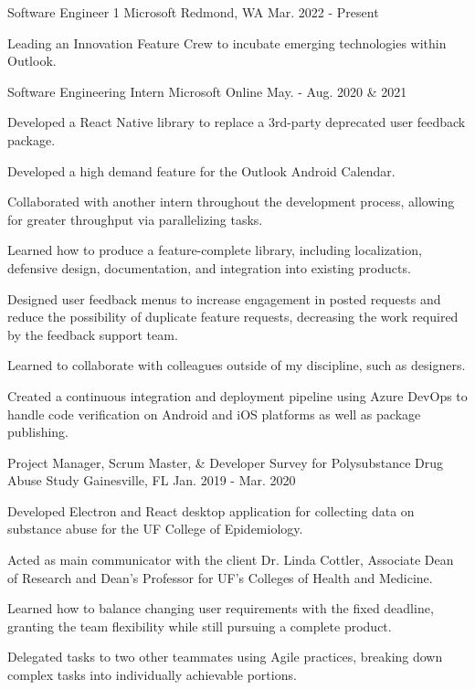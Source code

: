 \begin{cventries}
  \cventry
    {Software Engineer 1}
    {Microsoft}
    {Redmond, WA}
    {Mar. 2022 - Present}
    {
      \begin{cvitems}
        \item{Leading an Innovation Feature Crew to incubate emerging technologies within Outlook.}
      \end{cvitems}
    }
  \cventry
    {Software Engineering Intern}
    {Microsoft}
    {Online}
    {May. - Aug. 2020 \& 2021}
    {
      \begin{cvitems}
        \item{Developed a React Native library to replace a 3rd-party deprecated user feedback package.}
        \item{Developed a high demand feature for the Outlook Android Calendar.}
        \item{Collaborated with another intern throughout the development process, allowing for greater throughput via parallelizing tasks.}
        \item{Learned how to produce a feature-complete library, including localization, defensive design, documentation, and integration into existing products.}
        \item{Designed user feedback menus to increase engagement in posted requests and reduce the possibility of duplicate feature requests, decreasing the work required by the feedback support team.}
        \item{Learned to collaborate with colleagues outside of my discipline, such as designers.}
        \item{Created a continuous integration and deployment pipeline using Azure DevOps to handle code verification on Android and iOS platforms as well as package publishing.}
      \end{cvitems}
    }
  \cventry
    {Project Manager, Scrum Master, \& Developer}
    {Survey for Polysubstance Drug Abuse Study}
    {Gainesville, FL}
    {Jan. 2019 - Mar. 2020}
    {
      \begin{cvitems}
        \item {Developed Electron and React desktop application for collecting data on substance abuse for the UF College of Epidemiology.}
        \item {Acted as main communicator with the client Dr. Linda Cottler, Associate Dean of Research and Dean's Professor for UF's Colleges of Health and Medicine.}
        \item {Learned how to balance changing user requirements with the fixed deadline, granting the team flexibility while still pursuing a complete product.}
        \item {Delegated tasks to two other teammates using Agile practices, breaking down complex tasks into individually achievable portions.}
      \end{cvitems}
    }
\end{cventries}
